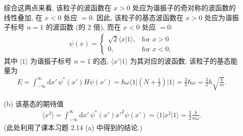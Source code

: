 \documentclass{assignment}
\begin{document}
\begin{sol}
\begin{itemize}
        综合这两点来看, 该粒子的波函数在 $x>0$ 处应为谐振子的奇对称的波函数的线性叠加, 在 $x<0$ 处应 $=0$.
        因此, 该粒子的基态波函数在 $x>0$ 处应为谐振子标号 $n=1$ 的波函数 (的 $2$ 倍), 而在 $x<0$ 处应 $=0$:
        \begin{align}
            \psi(x)=\left\{\begin{array}{ll}
                \sqrt{2}\langle x\rvert 1\rangle,&\text{for }x>0\\
                0,&\text{for }x<0,
            \end{array}\right.
        \end{align}
        其中 $\lvert 1\rangle$ 为谐振子标号 $n=1$ 的态, $\langle x'\vert 1\rangle$ 为其对应的波函数.
        该粒子的基态能量为
        \begin{align}
            E=\int_{-\infty}^{\infty}\mathrm{d}x'\,\psi^*(x')H\psi(x')=\hbar\omega\langle 1\rvert\left(N+\frac{1}{2}\right)\lvert 1\rangle=\frac{3}{2}\hbar\omega=\frac{3}{2}\hbar\sqrt{\frac{k}{m}}.
        \end{align}
        \item[(b)] 该基态的期待值
        \begin{align}
            \langle x^2\rangle=\int_{-\infty}^{\infty}\mathrm{d}x'\,\psi^*(x')x'^2\psi(x')=\langle 1\rvert x^2\lvert 1\rangle=\frac{3}{2}\frac{\hbar}{m\omega}.
        \end{align}
        (此处利用了课本习题 2.14 (a) 中得到的结论.)
    \end{itemize}
\end{sol}
\end{document}
